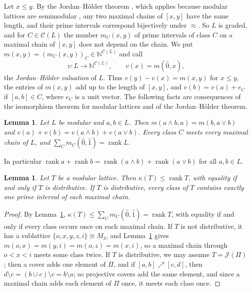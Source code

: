 \documentclass{amsart}
\newtheorem{lemma}[theorem]{Lemma}
\theoremstyle{definition}
\DeclareMathOperator{\rk}{rank}
\newcommand{\cC}{\mathcal C}
\newcommand{\N}{\mathbb N}
\begin{document}
Let $x\le y$. By the Jordan--H\"older theorem \cite[Theorems 374 and 377]{G}, which applies because modular lattices are semimodular \cite[Theorem 350]{G}, any two maximal chains of $[x,y]$ have the same length, and their prime intervals correspond bijectively under $\approx$. So $L$ is graded, and for $C\in\cC(L)$ the number $m_C(x,y)$ of prime intervals of class $C$ on a maximal chain of $[x,y]$ does not depend on the chain. We put $m(x,y)=(m_C(x,y))_C\in\N^{\cC(L)}$ and call
\[
v:L\to\N^{\cC(L)},\qquad v(x)=m(\hat0,x),
\]
the \emph{Jordan--H\"older valuation} of $L$. Thus $v(y)-v(x)=m(x,y)$ for $x\le y$, the entries of $m(x,y)$ add up to the length of $[x,y]$, and $v(b)=v(a)+e_C$ if $[a,b]\in C$, where $e_C$ is a unit vector. The following facts are consequences of the isomorphism theorem for modular lattices \cite[Theorem 348]{G} and of the Jordan--H\"older theorem.

\begin{lemma}\label{lem:valuation}
	Let $L$ be modular and $a,b\in L$. Then $m(a\wedge b,a)=m(b,a\vee b)$ and $v(a)+v(b)=v(a\wedge b)+v(a\vee b)$. Every class $C$ meets every maximal chain of $L$, and $\sum_Cm_C(\hat0,\hat1)=\rk L$.
\end{lemma}

In particular $\rk a+\rk b=\rk(a\wedge b)+\rk(a\vee b)$ for all $a,b\in L$.

\begin{lemma}\label{lem:kappa}
	Let $T$ be a modular lattice. Then $\kappa(T)\le\rk T$, with equality if and only if $T$ is distributive. If $T$ is distributive, every class of $T$ contains exactly one prime interval of each maximal chain.
\end{lemma}

\begin{proof}
	By Lemma~\ref{lem:valuation}, $\kappa(T)\le\sum_Cm_C(\hat0,\hat1)=\rk T$, with equality if and only if every class occurs once on each maximal chain. If $T$ is not distributive, it has a sublattice $\{o,x,y,z,i\}\cong M_3$, and Lemma~\ref{lem:valuation} gives $m(o,x)=m(y,i)=m(o,z)=m(x,i)$, so a maximal chain through $o<x<i$ meets some class twice. If $T$ is distributive, we may assume $T=\mathcal J(\Pi)$; then a cover adds one element of $\Pi$, and if $[a,b]\nearrow[c,d]$, then $d\setminus c=(b\cup c)\setminus c=b\setminus a$; so projective covers add the same element, and since a maximal chain adds each element of $\Pi$ once, it meets each class once.
\end{proof}
\end{document}
